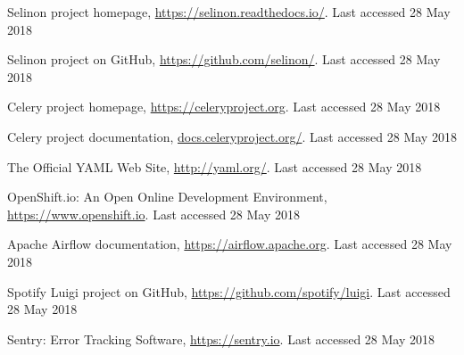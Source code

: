 \documentclass[a4paper]{llncs}
\begin{document}
%
%
%
% 
% 
%
\begin{thebibliography}{8}
Selinon project homepage, \url{https://selinon.readthedocs.io/}. Last accessed 28 May 2018

Selinon project on GitHub, \url{https://github.com/selinon/}. Last accessed 28 May 2018

Celery project homepage, \url{https://celeryproject.org}. Last accessed 28 May 2018

Celery project documentation, \url{docs.celeryproject.org/}. Last accessed 28 May 2018

The Official YAML Web Site, \url{http://yaml.org/}. Last accessed 28 May 2018

OpenShift.io: An Open Online Development Environment, \\ \url{https://www.openshift.io}. Last accessed 28 May 2018

Apache Airflow documentation, \url{https://airflow.apache.org}. Last accessed 28 May 2018

Spotify Luigi project on GitHub, \url{https://github.com/spotify/luigi}. Last accessed 28 May 2018

Sentry: Error Tracking Software, \url{https://sentry.io}. Last accessed 28 May 2018
\end{thebibliography}


\end{document}
